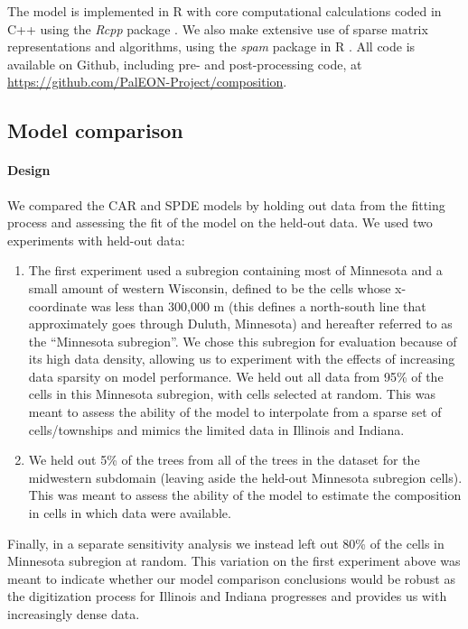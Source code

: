 \documentclass[10pt,letterpaper]{article}
\begin{document}
The model is implemented in R \cite{R:2014} with core computational
calculations coded in C++ using the \emph{Rcpp} package \cite{Edde:Fran:2011}.
We also make extensive use of sparse matrix representations and algorithms,
using the \emph{spam} package in R \cite{Furr:Sain:2010}. All code
is available on Github, including pre- and post-processing code, at
\href{https://github.com/PalEON-Project/composition}{https://github.com/PalEON-Project/composition}. 



\subsection*{Model comparison\label{sec:Model-comparison}}


\paragraph*{Design}

We compared the CAR and SPDE models by holding out
data from the fitting process and assessing the fit of the model
on the held-out data. We used two experiments with
held-out data:
\begin{enumerate}
\item The first experiment used a subregion containing most of Minnesota
and a small amount of western Wisconsin, defined to be the cells whose
x-coordinate was less than 300,000 m (this defines a north-south line
that approximately goes through Duluth, Minnesota) and hereafter referred
to as the ``Minnesota subregion''. We chose this subregion for evaluation
because of its high data density, allowing us to experiment with the
effects of increasing data sparsity on model performance. We held
out all data from 95\% of the cells in this Minnesota subregion, with
cells selected at random. This was meant to assess the ability of
the model to interpolate from a sparse set of cells/townships and
mimics the limited data in Illinois and Indiana.
\item We held out 5\% of the trees from all of the trees in the dataset
for the midwestern subdomain (leaving aside the held-out Minnesota
subregion cells). This was meant to assess the ability of the model
to estimate the composition in cells in which data were available. 
\end{enumerate}
Finally, in a separate sensitivity analysis we instead left out 80\%
of the cells in Minnesota subregion at random. This variation on the
first experiment above was meant to indicate whether our model comparison
conclusions would be robust as the digitization process for Illinois
and Indiana progresses and provides us with increasingly dense data. 
\end{document}
